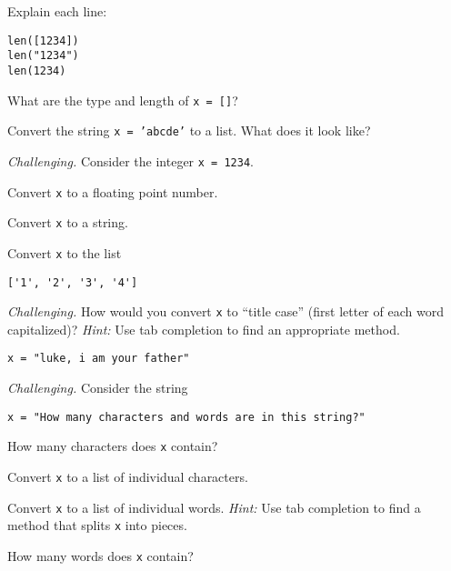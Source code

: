 \documentclass[11pt]{exam}
\begin{document}
\begin{questions}
\item Explain each line:
\begin{verbatim}
len([1234])
len("1234")
len(1234)
\end{verbatim}

\item What are the type and length of \texttt{x = []}?


\item Convert the string \texttt{x = 'abcde'} to a list.  What does it look like?

\item {\it Challenging.\/}
Consider the integer \texttt{x = 1234}.
\begin{parts}
\item Convert \texttt{x} to a floating point number.
\item Convert \texttt{x} to a string.
\item Convert \texttt{x} to the list
\begin{verbatim}
['1', '2', '3', '4']
\end{verbatim}

\end{parts}

\item {\it Challenging.\/}
How would you convert \texttt{x} to ``title case'' (first letter of each word capitalized)?
{\it Hint:\/} Use tab completion to find an appropriate method.
\begin{verbatim}
x = "luke, i am your father"
\end{verbatim}

\item {\it Challenging.\/} Consider the string
\begin{verbatim}
x = "How many characters and words are in this string?"
\end{verbatim}
\begin{parts}
\item How many characters does \texttt{x} contain?
\item Convert \texttt{x} to a list of individual characters.
\item Convert \texttt{x} to a list of individual words.
{\it Hint:\/}  Use tab completion to find a method that splits \texttt{x}
into pieces.
\item How many words does \texttt{x} contain?
\end{parts}





\end{questions}
\end{document}
